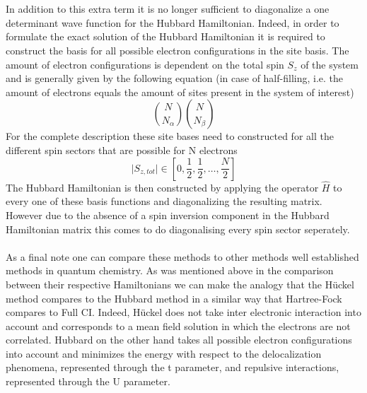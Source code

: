 \documentclass[]{article}
\begin{document}
\\
\\
In addition to this extra term it is no longer sufficient to diagonalize a one determinant wave function for the Hubbard Hamiltonian. Indeed, in order to formulate the exact solution of the Hubbard Hamiltonian it is required to construct the basis for all possible electron configurations in the site basis. The amount of electron configurations is dependent on the total spin $S_z$ of the system and is generally given by the following equation (in case of half-filling, i.e. the amount of electrons equals the amount of sites present in the system of interest)
\begin{equation}
	\binom{N}{N_{\alpha}}\binom{N}{N_{\beta}}
\end{equation}  
For the complete description these site bases need to constructed for all the different spin sectors that are possible for N electrons
\begin{equation}
	\lvert S_{z,tot} \rvert \in \left[ 0,\frac{1}{2},\frac{1}{2}, \dots, \frac{N}{2} \right]
\end{equation}
The Hubbard Hamiltonian is then constructed by applying the operator $\hat{H}$ to every one of these basis functions and diagonalizing the resulting matrix.
However due to the absence of a spin inversion component in the Hubbard Hamiltonian matrix this comes to do diagonalising every spin sector seperately.
\\
\\
As a final note one can compare these methods to other methods well established methods in quantum chemistry. As was mentioned above in the comparison between their respective Hamiltonians we can make the analogy that the Hückel method compares to the Hubbard method in a similar way that Hartree-Fock compares to Full CI. Indeed, Hückel does not take inter electronic interaction into account and corresponds to a mean field solution in which the electrons are not correlated. Hubbard on the other hand takes all possible electron configurations into account and minimizes the energy with respect to the delocalization phenomena, represented through the t parameter, and repulsive interactions, represented through the U parameter.  
\end{document}
